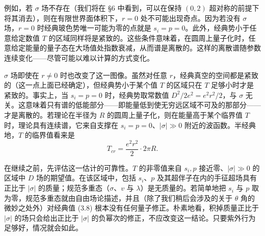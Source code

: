 例如，若 $\sigma$ 场不存在（我们将在 §6 中看到，可以在保持 $(0,2)$ 超对称的前提下将其消去），则在有限世界面体积下，$r=0$ 处不可能出现奇点。因为若没有 $\sigma$ 场，$r=0$ 时经典玻色势唯一可能为零的点就是 $s_i=p=0$。此外，经典势小于任意给定数值 $T$ 的区域同样将是紧致的。这些条件意味着，在圆周上量子化时，任意给定能量的量子态在大场值处指数衰减，从而谱是离散的。这样的离散谱随参数连续变化——尽管可能以难以计算的方式变化。


\label{op:21}
$\sigma$ 场即使在 $r\neq0$ 时也改变了这一图像。虽然对任意 $r$，经典真空的空间都是紧致的（这一点上面已经确定），但经典势小于某个值 $T$ 的区域只在 $T$ 足够小时才是紧致的。事实上，当 $s_i=p=0$ 时，经典势取常数值 $D^2/2e^2=e^2r^2/2$，与 $\sigma$ 无关。这意味着只有谱的低能部分——即能量低到使无穷远区域不可及的那部分——才是离散的。若理论在半径为 $R$ 的圆周上量子化，则在能量高于某个临界值 $T$ 时，理论具有连续谱，它来自支撑在 $s_i=p=0$、$|\sigma|\gg0$ 附近的波函数。半经典地，$T$ 的临界值看来是
\begin{equation}\tag{3.8}
T_{cr}=\frac{e^2r^2}{2}\cdot2\pi R.
\end{equation}


在继续之前，先评估这一估计的可靠性。$T$ 的非零值来自 $s_i,p$ 接近零、$|\sigma|\gg0$ 的区域中 $D$ 场的期望值。在该区域中，包括 $s_i$、$p$ 及其超伴子在内的手征超场具有正比于 $|\sigma|$ 的质量；规范多重态（$\sigma$、$v$ 与 $\lambda$）是无质量的。若简单地把 $s_i$ 与 $p$ 取为零，规范多重态就由自由场论描述，并且（除了我们稍后会涉及的关于 $\theta$ 角的微妙之处外）对经典值 (3.8) 根本没有任何量子修正。朴素地看，积掉质量正比于 $|\sigma|$ 的场只会给出正比于 $|\sigma|$ 的负幂次的修正，不应改变这一结论。只要紫外行为足够好，情况就会如此。

